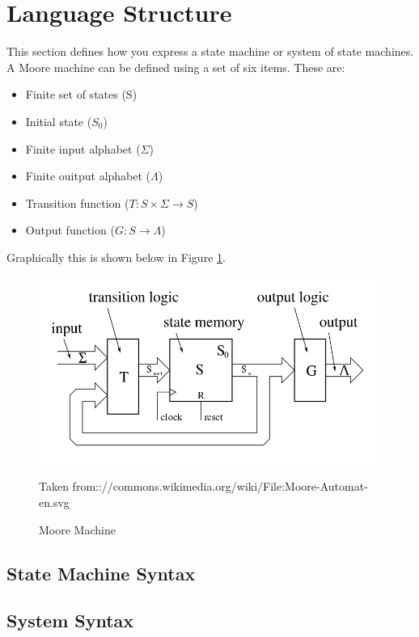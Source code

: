 \section{Language Structure}
This section defines how you express a state machine or system of state
machines. A Moore machine can be defined using a set of six items. These are:

\begin{itemize}
   \item Finite set of states (S)
   \item Initial state ($S_0$)
   \item Finite input alphabet ($\Sigma$)
   \item Finite ouitput alphabet ($\Lambda$)
   \item Transition function ($T:S\times\Sigma\rightarrow S$)
   \item Output function ($G:S \rightarrow \Lambda$)
\end{itemize}

Graphically this is shown below in Figure \ref{fig:MooreMachine}.

\begin{figure}[h]
   \centering
   \includegraphics[scale=0.4]{MooreMachine}
   \caption{Moore Machine}
   \small{Taken from:://commons.wikimedia.org/wiki/File:Moore-Automat-en.svg}
   \label{fig:MooreMachine}
\end{figure}
\FloatBarrier
\subsection{State Machine Syntax}

\subsection{System Syntax}
